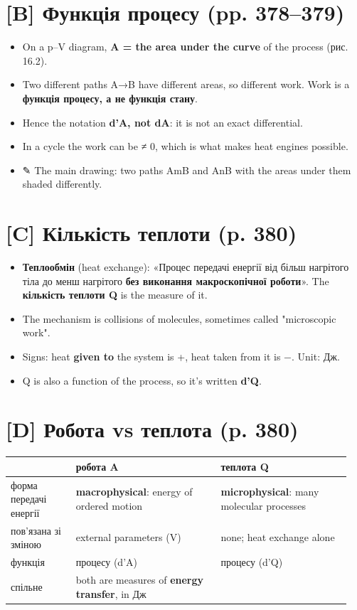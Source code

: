 \documentclass[11pt,a4paper,oneside]{book}
\newcommand{\pen}{{\sffamily\color{accent}✎}}
\begin{document}
\section*{[B] Функція процесу (pp. 378–379)}
\begin{itemize}
\item On a p–V diagram, \textbf{A = the area under the curve} of the process (рис. 16.2).
\item Two different paths A→B have different areas, so different work. Work is a \textbf{функція процесу, а не функція стану}.
\item Hence the notation \textbf{d'A, not dA}: it is not an exact differential.
\item In a cycle the work can be ≠ 0, which is what makes heat engines possible.
\item \pen{} The main drawing: two paths AmB and AnB with the areas under them shaded differently.
\end{itemize}

\section*{[C] Кількість теплоти (p. 380)}
\begin{itemize}
\item \textbf{Теплообмін} (heat exchange): «Процес передачі енергії від більш нагрітого тіла до менш нагрітого \textbf{без виконання макроскопічної роботи}». The \textbf{кількість теплоти Q} is the measure of it.
\item The mechanism is collisions of molecules, sometimes called "microscopic work".
\item Signs: heat \textbf{given to} the system is +, heat taken from it is −. Unit: Дж.
\item Q is also a function of the process, so it's written \textbf{d'Q}.
\end{itemize}

\section*{[D] Робота vs теплота (p. 380)}
{\small
\begin{longtable}{>{\raggedright\arraybackslash}p{0.187\linewidth}>{\raggedright\arraybackslash}p{0.400\linewidth}>{\raggedright\arraybackslash}p{0.365\linewidth}}
\toprule
\textbf{} & \textbf{робота A} & \textbf{теплота Q} \\
\midrule
\endhead
форма передачі енергії & \textbf{macrophysical}: energy of ordered motion & \textbf{microphysical}: many molecular processes \\
пов'язана зі зміною & external parameters (V) & none; heat exchange alone \\
функція & процесу (d'A) & процесу (d'Q) \\
спільне & both are measures of \textbf{energy transfer}, in Дж &  \\
\bottomrule
\end{longtable}
}
\end{document}
